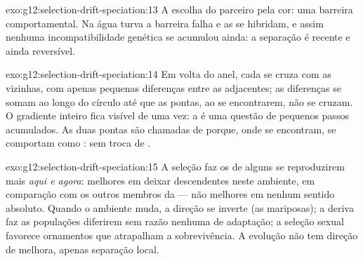 \begin{solution}{exo:g12:selection-drift-speciation:13}
A escolha do parceiro pela cor: uma barreira comportamental. Na água
turva a barreira falha e as  se hibridam, e assim nenhuma
incompatibilidade genética se acumulou ainda: a separação é recente e
ainda reversível.
\end{solution}

\begin{solution}{exo:g12:selection-drift-speciation:14}
Em volta do anel, cada  se cruza com as vizinhas, com apenas
pequenas diferenças entre as adjacentes; as diferenças se somam ao
longo do círculo até que as pontas, ao se encontrarem, não se cruzam. O
gradiente inteiro fica visível de uma vez: a  é uma questão
de pequenos passos acumulados. As duas pontas são chamadas de 
porque, onde se encontram, se comportam como : sem troca de .
\end{solution}

\begin{solution}{exo:g12:selection-drift-speciation:15}
A seleção faz os  de alguns  se reproduzirem mais
\emph{aqui e agora}: melhores em deixar descendentes neste ambiente, em
comparação com os outros membros da  --- não melhores em
nenhum sentido absoluto. Quando o ambiente muda, a direção se inverte
(as mariposas); a deriva faz as populações diferirem sem razão nenhuma
de adaptação; a seleção sexual favorece ornamentos que atrapalham a
sobrevivência. A evolução não tem direção de melhora, apenas separação local.
\end{solution}

